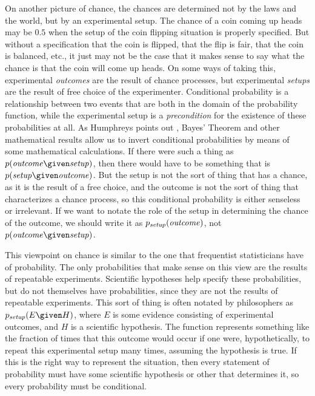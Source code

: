On another picture of chance, the chances are determined not by the laws and the world, but by an experimental setup. The chance of a coin coming up heads may be $0.5$ when the setup of the coin flipping situation is properly specified. But without a specification that the coin is flipped, that the flip is fair, that the coin is balanced, etc., it just may not be the case that it makes sense to say what the chance is that the coin will come up heads. On some ways of taking this, experimental \emph{outcomes} are the result of chance processes, but experimental \emph{setups} are the result of free choice of the experimenter. Conditional probability is a relationship between two events that are both in the domain of the probability function, while the experimental setup is a \emph{precondition} for the existence of these probabilities at all. As Humphreys points out \citep{humphreys1,humphreys}, Bayes' Theorem and other mathematical results allow us to invert conditional probabilities by means of some mathematical calculations. If there were such a thing as $p(\text{\textit{outcome}} \given \text{\textit{setup}})$, then there would have to be something that is $p(\text{\textit{setup}} \given \text{\textit{outcome}})$. But the setup is not the sort of thing that has a chance, as it is the result of a free choice, and the outcome is not the sort of thing that characterizes a chance process, so this conditional probability is either senseless or irrelevant. If we want to notate the role of the setup in determining the chance of the outcome, we should write it as $p_{\text{\textit{setup}}}(\text{\textit{outcome}})$, not $p(\text{\textit{outcome}} \given \text{\textit{setup}})$.

This viewpoint on chance is similar to the one that frequentist statisticians have of probability. The only probabilities that make sense on this view are the results of repeatable experiments. Scientific hypotheses help specify these probabilities, but do not themselves have probabilities, since they are not the results of repeatable experiments. This sort of thing is often notated by philosophers as $p_{\text{\textit{setup}}}(E \given H)$, where $E$ is some evidence consisting of experimental outcomes, and $H$ is a scientific hypothesis. The function represents something like the fraction of times that this outcome would occur if one were, hypothetically, to repeat this experimental setup many times, assuming the hypothesis is true. If this is the right way to represent the situation, then every statement of probability must have some scientific hypothesis or other that determines it, so every probability must be conditional.

